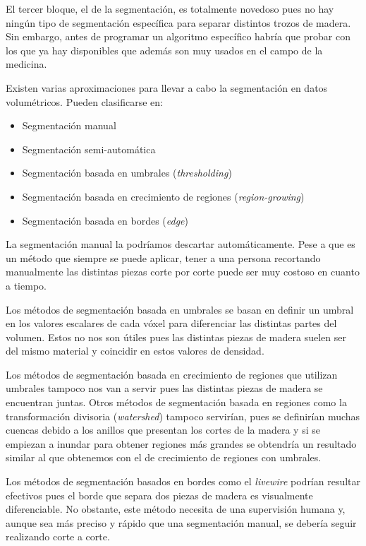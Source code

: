 El tercer bloque, el de la segmentación, es totalmente novedoso pues no hay ningún tipo de segmentación específica para separar distintos trozos de madera. Sin embargo, antes de programar un algoritmo específico habría que probar con los que ya hay disponibles que además son muy usados en el campo de la medicina.

Existen varias aproximaciones para llevar a cabo la segmentación en datos volumétricos. Pueden clasificarse en:

\begin{itemize}
	\item Segmentación manual
	\item Segmentación semi-automática
	\item Segmentación basada en umbrales (\textit{thresholding})
	\item Segmentación basada en crecimiento de regiones (\textit{region-growing})
	\item Segmentación basada en bordes (\textit{edge})
\end{itemize}

La segmentación manual la podríamos descartar automáticamente. Pese a que es un método que siempre se puede aplicar, tener a una persona recortando manualmente las distintas piezas corte por corte puede ser muy costoso en cuanto a tiempo.

Los métodos de segmentación basada en umbrales \cite{otsu79} se basan en definir un umbral en los valores escalares de cada vóxel para diferenciar las distintas partes del volumen. Estos no nos son útiles pues las distintas piezas de madera suelen ser del mismo material y coincidir en estos valores de densidad.

Los métodos de segmentación basada en crecimiento de regiones que utilizan umbrales \cite{haralick85} tampoco nos van a servir pues las distintas piezas de madera se encuentran juntas. Otros métodos de segmentación basada en regiones como la transformación divisoria (\textit{watershed}) \cite{beucher79} tampoco servirían, pues se definirían muchas cuencas debido a los anillos que presentan los cortes de la madera y si se empiezan a inundar para obtener regiones más grandes se obtendría un resultado similar al que obtenemos con el de crecimiento de regiones con umbrales.

Los métodos de segmentación basados en bordes como el \textit{livewire} \cite{mortensen95} podrían resultar efectivos pues el borde que separa dos piezas de madera es visualmente diferenciable. No obstante, este método necesita de una supervisión humana y, aunque sea más preciso y rápido que una segmentación manual, se debería seguir realizando corte a corte.


